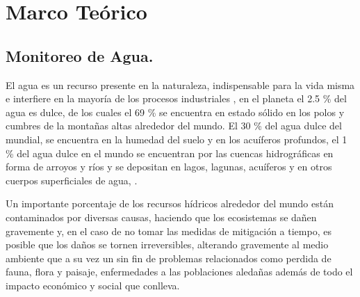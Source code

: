 
\chapter[Marco Te\'orico.]{Marco Te\'orico}

\section{Monitoreo de Agua.}
El agua es un recurso presente en la naturaleza, indispensable para la vida misma e interfiere en la mayoría de los procesos industriales \cite{estudio_agua}, en el planeta el 2.5 \% del agua es dulce, de los cuales el 69 \% se encuentra en estado sólido en los polos y cumbres de la monta\~nas altas alrededor del mundo. El 30 \% del agua dulce del mundial, se encuentra en la humedad del suelo y en los acuíferos profundos, el 1 \% del agua dulce en el mundo se encuentran por las cuencas hidrográficas en forma de arroyos y ríos y se depositan en lagos, lagunas, acuíferos y en otros cuerpos superficiales de agua,  \cite{junta-municipal-de-agua-potable-y-alcantarillado-de-mazatlan-no-date}.

Un importante porcentaje de los recursos h\'idricos alrededor del mundo están contaminados por diversas causas, haciendo que los ecosistemas se dañen gravemente y, en el caso de no tomar las medidas de mitigación a tiempo, es posible que los da\~nos se tornen irreversibles, alterando gravemente al medio ambiente que a su vez un sin fin de problemas relacionados como perdida de fauna, flora y paisaje, enfermedades a las poblaciones aledañas además de todo el impacto económico y social que conlleva.

